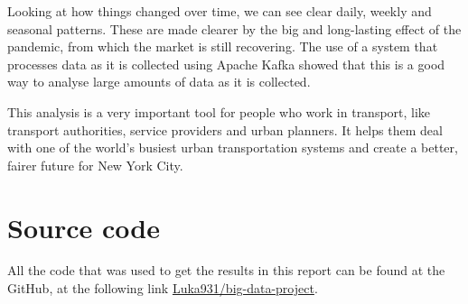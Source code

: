 \documentclass[conference]{IEEEtran}
\begin{document}
Looking at how things changed over time, we can see clear daily, weekly and seasonal patterns. These are made clearer by
the big and long-lasting effect of the pandemic, from which the market is still recovering. The use of a system that
processes data as it is collected using Apache Kafka showed that this is a good way to analyse large amounts of data as
it is collected.

This analysis is a very important tool for people who work in transport, like transport authorities, service providers
and urban planners. It helps them deal with one of the world's busiest urban transportation systems and create a better,
fairer future for New York City.


\appendices
\section{Source code}
All the code that was used to get the results in this report can be found at the GitHub, at the following link
\href{https://github.com/Luka931/big-data-project}{Luka931/big-data-project}.




\end{document}
